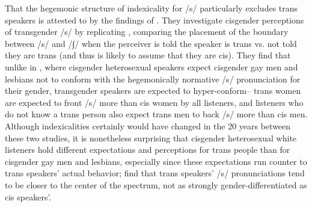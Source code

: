 \documentclass[12pt,twoside]{reedthesis}
\begin{document}
That the hegemonic structure of indexicality for /s/ particularly excludes trans speakers is attested to by the findings of \textcite{jessee_cisgender_2025}. They investigate cisgender perceptions of transgender /s/ by replicating \textcite{strand_uncovering_1999}, comparing the placement of the boundary between /s/ and /∫/ when the perceiver is told the speaker is trans vs. not told they are trans (and thus is likely to assume that they are cis). They find that unlike in \textcite{munson_influence_2006}, where cisgender heterosexual speakers expect cisgender gay men and lesbians not to conform with the hegemonically normative /s/ pronunciation for their gender, transgender speakers are expected to hyper-conform-- trans women are expected to front /s/ more than cis women by all listeners, and listeners who do not know a trans person also expect trans men to back /s/ more than cis men. Although indexicalities certainly would have changed in the 20 years between these two studies, it is nonetheless surprising that cisgender heterosexual white listeners hold different expectations and perceptions for trans people than for cisgender gay men and lesbians, especially since these expectations run counter to trans speakers' actual behavior; \textcite{podesva_sexuality_2015, hazenberg_language_2012, zimman_gender_2021}  find that trans speakers' /s/ pronunciations tend to be closer to the center of the spectrum, not as strongly gender-differentiated as cis speakers'.
\end{document}
